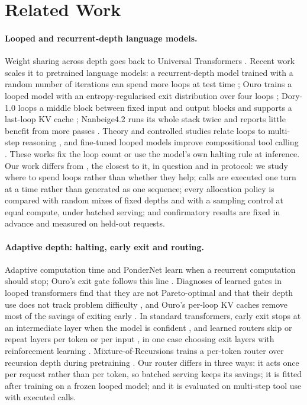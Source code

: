 \section{Related Work}
\label{sec:related}

\paragraph{Looped and recurrent-depth language models.}
Weight sharing across depth goes back to Universal Transformers \citep{dehghani2019universal}.
Recent work scales it to pretrained language models: a recurrent-depth model trained with a
random number of iterations can spend more loops at test time \citep{geiping2025recurrent};
Ouro trains a looped model with an entropy-regularised exit distribution over four loops
\citep{zhu2025ouro}; Dory-1.0 loops a middle block between fixed input and output blocks and
supports a last-loop KV cache \citep{nvidia2026dory}; Nanbeige4.2 runs its whole stack twice and
reports little benefit from more passes \citep{nanbeige2026}. Theory and controlled studies relate
loops to multi-step reasoning \citep{saunshi2025latent,kohli2026loop}, and fine-tuned looped
models improve compositional tool calling \citep{popescu2026toolcalling}. These works fix the
loop count or use the model's own halting rule at inference. Our work differs from
\citet{popescu2026toolcalling}, the closest to it, in question and in protocol: we study where
to spend loops rather than whether they help; calls are executed one turn at a time rather than
generated as one sequence; every allocation policy is compared with random mixes of fixed depths
and with a sampling control at equal compute, under batched serving; and confirmatory results
are fixed in advance and measured on held-out requests.

\paragraph{Adaptive depth: halting, early exit and routing.}
Adaptive computation time \citep{graves2016adaptive} and PonderNet \citep{banino2021pondernet}
learn when a recurrent computation should stop; Ouro's exit gate follows this line
\citep{zhu2025ouro}. Diagnoses of learned gates in looped transformers find that they are not
Pareto-optimal and that their depth use does not track problem difficulty \citep{popescu2026halting,olszowiec2026monitoring}, and Ouro's per-loop KV caches remove most of the
savings of exiting early \citep{mishra2026dynamic}. In standard
transformers, early exit stops at an intermediate layer when the model is confident
\citep{schuster2022calm,elhoushi2024layerskip}, and learned routers skip or repeat layers per
token or per input
\citep{raposo2024mod,he2025routertuning,luo2025flexidepth,heakl2026drllm,li2025cola}, in one
case choosing exit layers with reinforcement learning \citep{zhu2026lede}.
Mixture-of-Recursions trains a per-token router over recursion depth during pretraining
\citep{bae2025mor}. Our router differs in three ways: it acts once per request rather than per
token, so batched serving keeps its savings; it is fitted after training on a frozen looped model;
and it is evaluated on multi-step tool use with executed calls.

